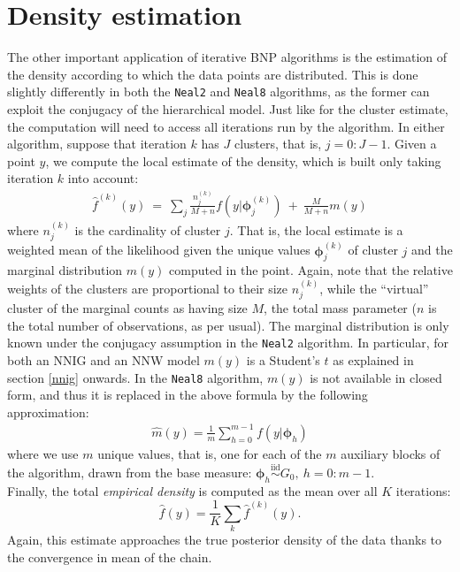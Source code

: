 \section{Density estimation}\label{dens-estim}
The other important application of iterative BNP algorithms is the estimation of the density according to which the data points are distributed.
This is done slightly differently in both the \verb|Neal2| and \verb|Neal8| algorithms, as the former can exploit the conjugacy of the hierarchical model.
Just like for the cluster estimate, the computation will need to access all iterations run by the algorithm.
In either algorithm, suppose that iteration $k$ has $J$ clusters, that is, $j=0:J-1$.
Given a point $y$, we compute the local estimate of the density, which is built only taking iteration $k$ into account:
\begin{equation}\label{localdens}
	\begin{aligned}
		\hat f^{(k)}(y) \ = \ \sum_j \frac{n^{(k)}_j}{M+n} f\left(y | \boldsymbol{\phi}^{(k)}_j\right) \ + \ \frac{M}{M+n} m(y)
	\end{aligned}
\end{equation}
where $n^{(k)}_j$ is the cardinality of cluster $j$.
That is, the local estimate is a weighted mean of the likelihood given the unique values $\boldsymbol{\phi}^{(k)}_j$ of cluster $j$ and the marginal distribution $m(y)$ computed in the point.
Again, note that the relative weights of the clusters are proportional to their size $n^{(k)}_j$, while the ``virtual'' cluster of the marginal counts as having size $M$, the total mass parameter ($n$ is the total number of observations, as per usual).
The marginal distribution is only known under the conjugacy assumption in the \verb|Neal2| algorithm.
In particular, for both an NNIG and an NNW model $m(y)$ is a Student's $t$ as explained in section \ref{nnig} onwards.
In the \verb|Neal8| algorithm, $m(y)$ is not available in closed form, and thus it is replaced in the above formula by the following approximation:
\begin{equation}\label{margneal8}
	\begin{aligned}
		\hat m(y) = \frac{1}{m} \sum_{h=0}^{m-1}  f\left(y | \boldsymbol{\phi}_h\right)
	\end{aligned}
\end{equation}
where we use $m$ unique values, that is, one for each of the $m$ auxiliary blocks of the algorithm, drawn from the base measure: $\boldsymbol{\phi}_{h} \overset{\text{iid}}{\sim} G_0, \ h=0:m-1$. \\
Finally, the total \emph{empirical density} is computed as the mean over all $K$ iterations:
$$
\hat f(y) = \frac{1}{K} \sum_k \hat f^{(k)}(y).
$$
Again, this estimate approaches the true posterior density of the data thanks to the convergence in mean of the chain.
